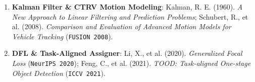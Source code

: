 \documentclass[10.5pt,a4paper]{article}
\begin{document}
\begin{enumerate}[leftmargin=1.8em,itemsep=2pt]
\item \textbf{Kalman Filter \& CTRV Motion Modeling}: Kalman, R. E. (1960). \textit{A New Approach to Linear Filtering and Prediction Problems}; Schubert, R., et al. (2008). \textit{Comparison and Evaluation of Advanced Motion Models for Vehicle Tracking} (\texttt{FUSION 2008}).
\item \textbf{DFL \& Task-Aligned Assigner}: Li, X., et al. (2020). \textit{Generalized Focal Loss} (\texttt{NeurIPS 2020}); Feng, C., et al. (2021). \textit{TOOD: Task-aligned One-stage Object Detection} (\texttt{ICCV 2021}).
\end{enumerate}
\end{document}
